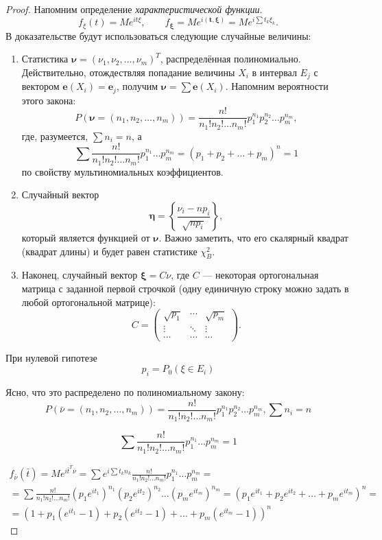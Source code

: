 \begin{proof}
  Напомним определение \emph{характеристической функции}.
  \[
    f_\xi (t) = M e^{i t \xi},\qquad f_{\bm\xi} = M e^{i (\mathbf t, \bm \xi)} =
    M e^{i \sum t_k \xi_k}.
  \]
В доказательстве будут использоваться следующие случайные величины:
\begin{enumerate}
  \item Статистика $ \bm \nu = (\nu_1, \nu_2, \ldots, \nu_m)^T$, распределённая
    полиномиально. Действительно, отождествляя попадание величины $ X_i $ в
    интервал $ E_j $ с вектором $ \mathbf e(X_i) = \mathbf e_j $,
    получим $ \bm \nu = \sum \mathbf e(X_i) $. Напомним вероятности этого
    закона: 
      \[
    P(\bm\nu = (n_1, n_2, \dots, n_m)) = \frac{n!}{n_1! n_2! \dots n_m!}
    p_1^{n_1} p_2^{n_2} \dots p_m^{n_m}, 
  \]
  где, разумеется, $\sum n_i = n$, а
  \[
    \sum \frac{n!}{n_1! n_2! \dots n_m!} p_1^{n_1} \dots p_m^{n_m} = (p_1 + p_2
    + \ldots + p_m)^n = 1
  \]
  по свойству мультиномиальных коэффициентов.
    
  \item Случайный вектор
  \[
  \bm\eta = \left\{\frac{\nu_i - np_i}{\sqrt{np_i}}\right\},
  \]
  который является функцией от $ \bm \nu $. Важно заметить, что его скалярный
  квадрат (квадрат длины) и будет равен статистике $ \chi^2_B $.
\item Наконец, случайный вектор $ \bm \xi = C \nu $, где $ C $ --- некоторая
  ортогональная матрица с заданной первой строчкой (одну единичную строку можно задать в
  любой ортогональной матрице): 
  \[
    C = \begin{pmatrix}
      \sqrt{p_1} & \cdots & \sqrt{p_m} \\
      \vdots & \ddots & \vdots \\
      \cdots & \cdots & \cdots
    \end{pmatrix}.
  \]
  
  
\end{enumerate}


  При нулевой гипотезе
  \[
    p_i = P_0 (\xi \in E_i)
  \]

  Ясно, что это распределено по полиномиальному закону:
  \[
    P(\bar \nu = (n_1, n_2, \dots, n_m)) = \frac{n!}{n_1! n_2! \dots n_m!} p_1^{n_1} p_2^{n_2} \dots p_m^{n_m}, \sum n_i = n
  \]

  \[
    \sum \frac{n!}{n_1! n_2! \dots n_m!} p_1^{n_1} \dots p_m^{n_m} = 1
  \]

  \begin{multline*}
    f_{\bar \nu} (\bar t) = M e^{i \bar t^T \bar \nu} =
    \sum e^{i \sum t_k n_k} \frac{n!}{n_1! n_2! \dots n_m!} p_1^{n_1} \dots p_m^{n_m} = \\
    = \sum \frac{n!}{n_1! n_2! \dots n_m!} (p_1 e^{i t_1})^{n_1} (p_2 e^{i t_2})^{n_2} \dots (p_m e^{i t_m})^{n_m} = 
    (p_1 e^{i t_1} + p_2 e^{i t_2} + \dots + p_m e^{i t_m})^n = \\
    = (1 + p_1 (e^{i t_1} - 1) + p_2 (e^{i t_2} - 1) + \dots + p_m (e^{i t_m} - 1))^n
  \end{multline*}


\end{proof}
